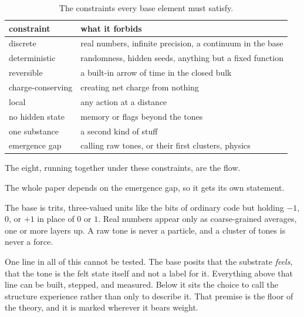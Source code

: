 \begin{table}[ht]
\centering
\begin{tabular}{@{}lp{}@{}}
\toprule
constraint & what it forbids \\
\midrule
discrete & real numbers, infinite precision, a continuum in the base \\
deterministic & randomness, hidden seeds, anything but a fixed function \\
reversible & a built-in arrow of time in the closed bulk \\
charge-conserving & creating net charge from nothing \\
local & any action at a distance \\
no hidden state & memory or flags beyond the tones \\
one substance & a second kind of stuff \\
emergence gap & calling raw tones, or their first clusters, physics \\
\bottomrule
\end{tabular}
\caption{The constraints every base element must satisfy.}
\label{tab:constraints}
\end{table}

The eight, running together under these constraints, are the flow.

The whole paper depends on the emergence gap, so it gets its own statement.

\begin{principle}
The base is trits, three-valued units like the bits of ordinary code but holding $-1$, $0$, or $+1$ in place of $0$ or $1$. Real numbers appear only as coarse-grained averages, one or more layers up. A raw tone is never a particle, and a cluster of tones is never a force.
\end{principle}

One line in all of this cannot be tested. The base posits that the substrate \emph{feels}, that the tone is the felt state itself and not a label for it. Everything above that line can be built, stepped, and measured. Below it sits the choice to call the structure experience rather than only to describe it. That premise is the floor of the theory, and it is marked wherever it bears weight.
